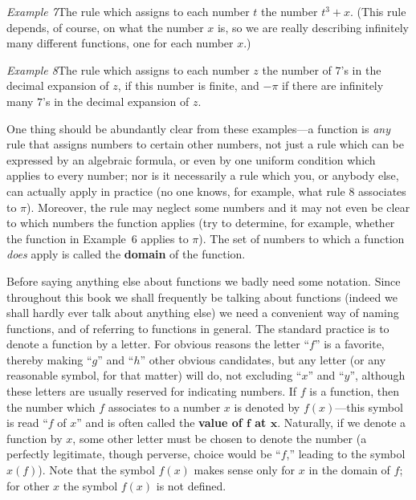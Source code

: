 \textit{Example 7}\quad The rule which assigns to each number $t$ the number
$t^3 + x$. (This rule depends, of course, on what the number $x$ is, so we are
really describing infinitely many different functions, one for each number $x$.)

\textit{Example 8}\quad The rule which assigns to each number $z$ the number of
$7$'s in the decimal expansion of $z$, if this number is finite, and $-\pi$ if there
are infinitely many $7$'s in the decimal expansion of $z$.

One thing should be abundantly clear from these examples---a function is
\emph{any} rule that assigns numbers to certain other numbers, not just a rule
which can be expressed by an algebraic formula, or even by one uniform
condition which applies to every number; nor is it necessarily a rule which you,
or anybody else, can actually apply in practice (no one knows, for example,
what rule $8$ associates to $\pi$). Moreover, the rule may neglect some numbers
and it may not even be clear to which numbers the function applies (try to
determine, for example, whether the function in Example~$6$ applies to $\pi$).
The set of numbers to which a function \emph{does} apply is called the
\textbf{domain} of the function.

Before saying anything else about functions we badly need some notation.
Since throughout this book we shall frequently be talking about functions
(indeed we shall hardly ever talk about anything else) we need a convenient
way of naming functions, and of referring to functions in general. The
standard practice is to denote a function by a letter. For obvious reasons the
letter ``$f$'' is a favorite, thereby making ``$g$'' and ``$h$'' other obvious
candidates, but any letter (or any reasonable symbol, for that matter) will do,
not excluding ``$x$'' and ``$y$'', although these letters are usually reserved for
indicating numbers. If $f$ is a function, then the number which $f$ associates
to a number $x$ is denoted by $f(x)$---this symbol is read ``$f$ of $x$'' and is
often called the \textbf{value of $\boldsymbol{f}$ at $\boldsymbol{x}$}. Naturally, if we denote a
function by $x$, some other letter must be chosen to denote the number (a
perfectly legitimate, though perverse, choice would be ``$f$,'' leading to the
symbol $x(f)$). Note that the symbol $f(x)$ makes sense only for $x$ in the
domain of $f$; for other $x$ the symbol $f(x)$ is not defined.

